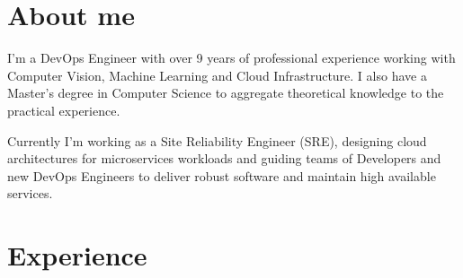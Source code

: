 \documentclass[a4paper]{cv-friggeri-x}
\begin{document}

\section{About me}
I'm a DevOps Engineer with over 9 years of professional experience working with Computer Vision, Machine Learning and Cloud Infrastructure. I also have a Master's degree in Computer Science to aggregate theoretical knowledge to the practical experience.

Currently I'm working as a Site Reliability Engineer (SRE), designing cloud architectures for microservices workloads and guiding teams of Developers and new DevOps Engineers to deliver robust software and maintain high available services.



\section{Experience}

\end{document}
